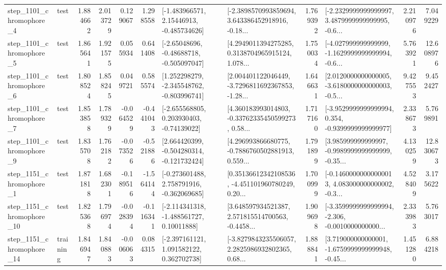 \begin{tabular}{llrrrrllrlrr}
  step\_1101\_chromophore\_4 &      test &      1.884662 &    2.013729 &      0.129067 &  1.298558 &    [-1.483966571, 2.15446913, -0.485734626] &  [-2.3898570993859694, 3.643386452918916, -0.18... &       1.769392 &  [-2.2329999999999997, 3.4879999999999995, -0.6... &            2.210976 &          7.049229 \\
  step\_1101\_chromophore\_5 &      test &      1.865641 &    1.921575 &      0.055934 &  0.641408 &    [-2.65048696, -0.48688718, -0.505097047] &  [4.2949011394275285, 0.3138704965915124, 1.078... &       1.750034 &  [-4.027999999999999, -1.1629999999999994, -0.6... &            5.763921 &         12.608976 \\
  step\_1101\_chromophore\_6 &      test &      1.808524 &    1.858245 &      0.049721 &  0.585574 &   [1.252298279, -2.345548762, -0.803996741] &  [2.004401122046449, -3.7296811692367853, -1.28... &       1.646631 &  [2.0120000000000005, -3.6180000000000003, -0.5... &            9.427553 &          9.452427 \\
  step\_1101\_chromophore\_7 &      test &      1.853858 &    1.789329 &     -0.064529 & -0.441043 &    [-2.655568805, 0.203930403, -0.74139022] &  [4.360183993014803, -0.33762335450599273, 0.58... &       1.717160 &  [-3.9529999999999994, 0.354, -0.9399999999999977] &            2.338673 &          5.769891 \\
  step\_1101\_chromophore\_9 &      test &      1.835708 &    1.762182 &     -0.073526 & -0.521886 &   [2.664420399, -0.504280314, -0.121732424] &  [4.296993866680775, -0.7886760502881913, 0.559... &       1.791899 &  [3.985999999999997, -0.9989999999999999, -0.35... &            4.130259 &         12.830673 \\
  step\_1151\_chromophore\_1 &      test &      1.871818 &    1.682301 &     -0.189516 & -1.564144 &   [-0.273601488, 2.758791916, -0.362069685] &  [0.35136612342108536, -4.451101960780249, 0.20... &       1.700999 &  [-0.14600000000000013, 4.083000000000002, -0.3... &            4.528409 &          3.175622 \\
 step\_1151\_chromophore\_10 &      test &      1.825368 &    1.796974 &     -0.028394 & -0.116341 &    [-2.114341318, -1.488561727, 0.10011888] &  [3.648597934521387, 2.571815514700563, -0.4458... &       1.909698 &  [-3.3599999999999994, -2.306, -0.0010000000000... &            2.333983 &          5.763017 \\
 step\_1151\_chromophore\_14 &  training &      1.846947 &    1.840883 &     -0.006063 &  0.084315 &    [-2.397161121, 1.091582122, 0.362702738] &  [-3.8279843235506057, 2.2825986932802365, 0.68... &       1.888841 &  [3.719000000000001, -1.6759999999999948, -0.45... &            1.451280 &          6.884218 \\

\end{tabular}
